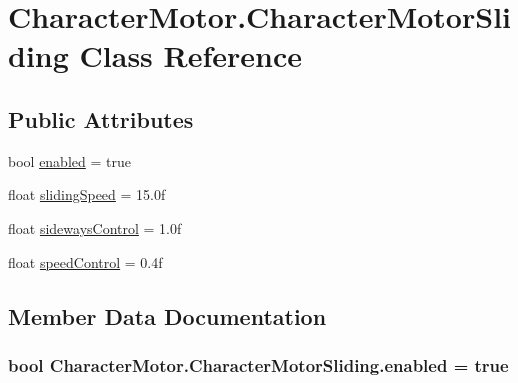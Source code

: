 \hypertarget{class_character_motor_1_1_character_motor_sliding}{}\section{Character\+Motor.\+Character\+Motor\+Sliding Class Reference}
\label{class_character_motor_1_1_character_motor_sliding}
\subsection*{Public Attributes}
\begin{DoxyCompactItemize}
\item 
bool \hyperlink{class_character_motor_1_1_character_motor_sliding_a0229a8ded10ab5dec05c881d398972e7}{enabled} = true
\item 
float \hyperlink{class_character_motor_1_1_character_motor_sliding_a737e4971b2fa4f4d8a59beabb9b4d32a}{sliding\+Speed} = 15.\+0f
\item 
float \hyperlink{class_character_motor_1_1_character_motor_sliding_ae33f7893434835b8c77d93be5b825fe4}{sideways\+Control} = 1.\+0f
\item 
float \hyperlink{class_character_motor_1_1_character_motor_sliding_af46b4c13765ed9e3243ac3d977094692}{speed\+Control} = 0.\+4f
\end{DoxyCompactItemize}


\subsection{Member Data Documentation}
\hypertarget{class_character_motor_1_1_character_motor_sliding_a0229a8ded10ab5dec05c881d398972e7}{}
\subsubsection[{enabled}]{\setlength{\rightskip}{0pt plus 5cm}bool Character\+Motor.\+Character\+Motor\+Sliding.\+enabled = true}\label{class_character_motor_1_1_character_motor_sliding_a0229a8ded10ab5dec05c881d398972e7}
\hypertarget{class_character_motor_1_1_character_motor_sliding_ae33f7893434835b8c77d93be5b825fe4}{}
